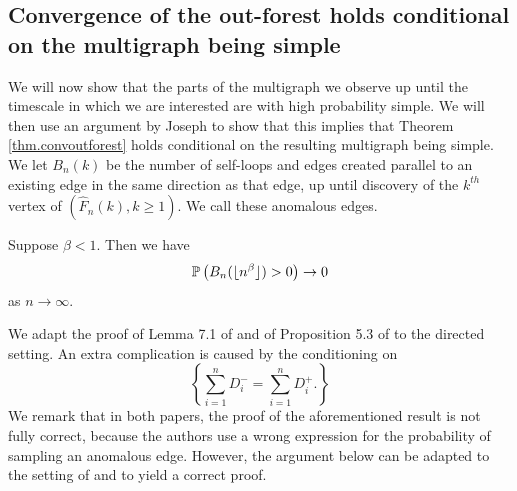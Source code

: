 \subsection{Convergence of the out-forest holds conditional on the multigraph being simple}
We will now show that the parts of the multigraph we observe up until the timescale in which we are interested are with high probability simple. We will then use an argument by Joseph \cite{Joseph2014} to show that this implies that Theorem \ref{thm.convoutforest} holds conditional on the resulting multigraph being simple. We let $B_n(k)$ be the number of self-loops and edges created parallel to an existing edge in the same direction as that edge, up until discovery of the $k^{th}$ vertex of $(\hat{F}_n(k),k\geq 1)$. We call these anomalous edges. 
\begin{proposition}\label{prop.anomalousedges}
Suppose $\beta<1$. Then we have
$$\P\left(B_n(\lfloor n^\beta \rfloor)>0\right)\to 0$$
as $n\to \infty$.
\end{proposition}
\begin{remark}
We adapt the proof of Lemma 7.1 of \cite{Joseph2014} and of Proposition 5.3 of \cite{Conchon2018} to the directed setting. An extra complication is caused by the conditioning on $$\left\{\sum_{i=1}^n D^-_i=\sum_{i=1}^n D^+_i.\right\}$$ We remark that in both papers, the proof of the aforementioned result is not fully correct, because the authors use a wrong expression for the probability of sampling an anomalous edge. However, the argument below can be adapted to the setting of \cite{Joseph2014} and \cite{Conchon2018} to yield a correct proof.
\end{remark}
